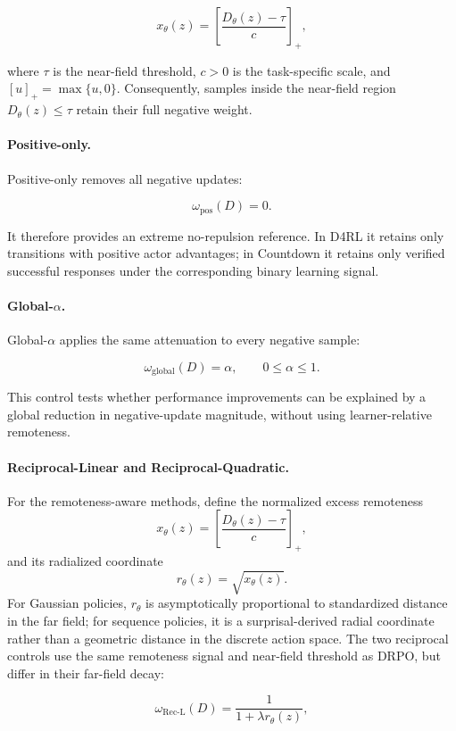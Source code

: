 \documentclass{article}
\theoremstyle{plain}
\theoremstyle{definition}
\theoremstyle{remark}
\begin{document}
\[
x_\theta(z)
=
\left[
\frac{D_\theta(z)-\tau}{c}
\right]_{+},
\]

where \(\tau\) is the near-field threshold, \(c>0\) is the task-specific
scale, and \([u]_{+}=\max\{u,0\}\). Consequently, samples inside the
near-field region \(D_\theta(z)\leq\tau\) retain their full negative
weight.

\paragraph{Positive-only.}

Positive-only removes all negative updates:

\[
\omega_{\mathrm{pos}}(D)=0.
\]

It therefore provides an extreme no-repulsion reference. In D4RL it
retains only transitions with positive actor advantages; in Countdown
it retains only verified successful responses under the corresponding
binary learning signal.

\paragraph{Global-\(\alpha\).}

Global-\(\alpha\) applies the same attenuation to every negative sample:

\[
\omega_{\mathrm{global}}(D)=\alpha,
\qquad
0\leq\alpha\leq 1.
\]

This control tests whether performance improvements can be explained by
a global reduction in negative-update magnitude, without using
learner-relative remoteness.

\paragraph{Reciprocal-Linear and Reciprocal-Quadratic.}
For the remoteness-aware methods, define the normalized excess
remoteness
\[
x_\theta(z)
=
\left[
\frac{D_\theta(z)-\tau}{c}
\right]_{+},
\]
and its radialized coordinate
\[
r_\theta(z)=\sqrt{x_\theta(z)}.
\]
For Gaussian policies, \(r_\theta\) is asymptotically proportional to
standardized distance in the far field; for sequence policies, it is a
surprisal-derived radial coordinate rather than a geometric distance in
the discrete action space.
The two reciprocal controls use the same remoteness signal and
near-field threshold as DRPO, but differ in their far-field decay:

\[
\omega_{\mathrm{Rec\text{-}L}}(D)
=
\frac{1}{1+\lambda r_\theta(z)},
\]
\end{document}
